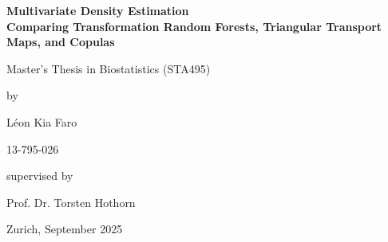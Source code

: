 \begin{titlepage}
\thispagestyle{empty}
\renewcommand\familydefault{\sfdefault}
\renewcommand{\baselinestretch}{1.5}\normalfont
\begin{center}
  \setlength{\parindent}{0cm}
  {\bfseries\Large
  Multivariate Density Estimation\\
  Comparing Transformation Random Forests, Triangular Transport Maps, and Copulas\par}

  \vspace{2mm}
  \hrulefill

  \vspace*{4cm}

  {\large Master’s Thesis in Biostatistics (STA495)\par}

  \vspace*{12mm}
  by

  \vspace*{12mm}
  Léon Kia Faro \\
  {\small 13-795-026\par}

  \vspace*{4cm}
  supervised by

  \vspace*{12mm}
  Prof. Dr. Torsten Hothorn

  \vfill
  Zurich, September 2025 
\end{center}
\renewcommand\familydefault{\rmdefault}
\renewcommand{\baselinestretch}{1.0}\rmfamily
\setcounter{page}{0}
\end{titlepage}
\restoregeometry
\cleardoublepage
